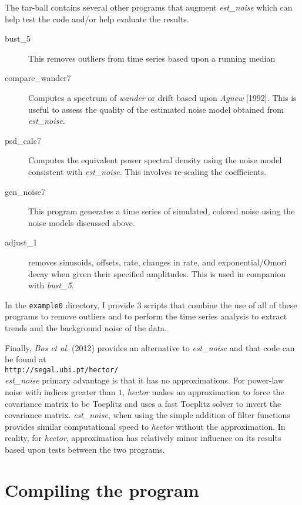 \documentclass[12pt]{amsart}
\begin{document}
The tar-ball contains several other programs that augment \textit{est\_noise} which can help test the code and/or help evaluate the results.
\begin{description}
\item[bust\_5]  This removes outliers from time series based upon a running median
\item[compare\_wander7]  Computes a spectrum of \textit{wander} or drift based upon \textit{Agnew} [1992]. This is
useful to assess the quality of the estimated noise model obtained from \textit{est\_noise}.  
\item[psd\_calc7] Computes the equivalent power spectral density using the noise model consistent with \textit{est\_noise}.
This involves re-scaling the coefficients.
\item[gen\_noise7] This program generates a time series of simulated, colored noise using the noise models discussed
above.
\item[adjust\_1]  removes sinusoids, offsets, rate, changes in rate, and exponential/Omori decay when given their
specified amplitudes. This is used in companion with \textit{bust\_5}.
\end{description}

In the \texttt{example0} directory, I provide 3 scripts that combine the use of all of these programs to remove outliers
and to perform the time series analysis to extract trends and the background noise of the data. 

Finally, \textit{Bos et al.} (2012) provides an alternative to \textit{est\_noise} and that code can be found
at
\\
\texttt{http://segal.ubi.pt/hector/}
\\
\textit{est\_noise} primary advantage is that it has no approximations.  For power-law noise with indices greater than $1$,
\textit{hector} makes an approximation to force the covariance matrix to be Toeplitz and uses a fast Toeplitz solver
to invert the covariance matrix. \textit{est\_noise}, when using the simple addition of filter functions provides similar computational
speed to \textit{hector} without the approximation. In reality, for \textit{hector}, approximation has relatively minor influence on
its results based upon tests between the two programs.


\section{Compiling the program}
\end{document}
